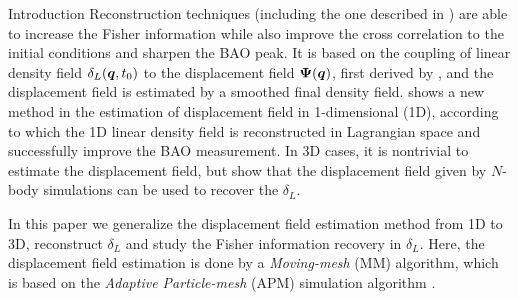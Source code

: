 \begin{section}{Introduction}
Reconstruction techniques (including the one described in 
\cite{bib:HarnoisD2013}) are able to increase the Fisher information
while also improve the cross correlation to the initial conditions
and sharpen the BAO peak. It is based on the coupling of linear
density field $\delta_L(\boldsymbol{q},t_0)$ to the displacement field
$\boldsymbol\Psi(\boldsymbol{q})$, first derived by \cite{bib:Zel1970}, and
the displacement field is estimated by a smoothed final density field.
\cite{bib:Zhu2016} shows a new method in the estimation of displacement
field in 1-dimensional (1D), according to which the 1D linear density
field is reconstructed in Lagrangian space and successfully improve
the BAO measurement. In 3D cases, it is nontrivial to estimate
the displacement field, but \cite{bib:Yu2016} show that the displacement
field given by $N$-body simulations can be used to recover the $\delta_L$.

In this paper we generalize the displacement field estimation method
from 1D \citep{bib:Zhu2016} to 3D, reconstruct $\delta_L$ and study
the Fisher information recovery in $\delta_L$. Here, the displacement field
estimation is done by a \textit{Moving-mesh} (MM) algorithm, which is based on
the \textit{Adaptive Particle-mesh} (APM) simulation algorithm \citep{bib:Pen1995,bib:Pen1998}.






\end{section}

